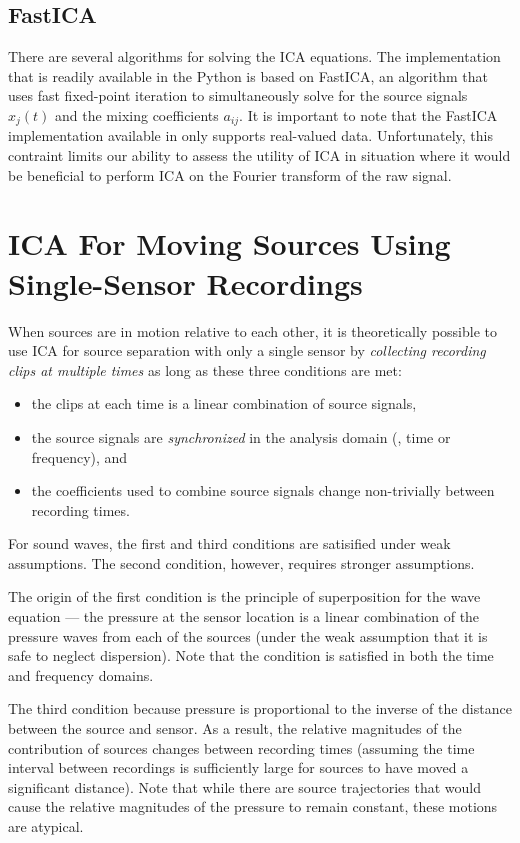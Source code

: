 \documentclass[10pt]{article}
\begin{document}
\subsection*{FastICA}
There are several algorithms for solving the ICA equations. The implementation that is
readily available in the  Python is based on FastICA\cite{hyvarinen:1999,
sklearn-fastica}, an algorithm that uses fast fixed-point iteration to simultaneously
solve for the source signals $x_j(t)$ and the mixing coefficients $a_{ij}$. It is
important to note that the FastICA implementation available in  only
supports real-valued data. Unfortunately, this contraint limits our ability to assess
the utility of ICA in situation where it would be beneficial to perform ICA on the Fourier
transform of the raw signal.


\section{ICA For Moving Sources Using Single-Sensor Recordings}
When sources are in motion relative to each other, it is theoretically possible to use ICA
for source separation with only a single sensor by \emph{collecting recording clips at
multiple times} as long as these three conditions are met:
\begin{itemize}
    \item the clips at each time is a linear combination of source signals,

    \item the source signals are \emph{synchronized} in the analysis domain (\ie, time
        or frequency), and

    \item the coefficients used to combine source signals change non-trivially between
        recording times.
\end{itemize}
For sound waves, the first and third conditions are satisified under weak assumptions.
The second condition, however, requires stronger assumptions.

The origin of the first condition is the principle of superposition for the wave equation
--- the pressure at the sensor location is a linear combination of the pressure waves from
each of the sources (under the weak assumption that it is safe to neglect dispersion). Note
that the condition is satisfied in both the time and frequency domains.

The third condition because pressure is proportional to the inverse of the distance between
the source and sensor. As a result, the relative magnitudes of the contribution of sources
changes between recording times (assuming the time interval between recordings is
sufficiently large for sources to have moved a significant distance). Note that while there
are source trajectories that would cause the relative magnitudes of the pressure to remain
constant, these motions are atypical.
\end{document}
